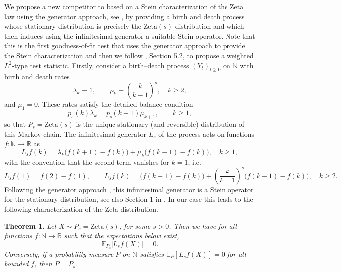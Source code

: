 \documentclass{article}
\theoremstyle{thm}
\newtheorem{theorem}{Theorem}[section]
\theoremstyle{def}
\begin{document}
We propose a new competitor to \cite{M:2009} based on a Stein characterization of the Zeta law using the generator approach, see \cite{B:1988,B:1990}, by providing a birth and death process whose stationary distribution is precisely the Zeta$(s)$ distribution and which then induces using the infinitesimal generator a suitable Stein operator. Note that this is the first goodness-of-fit test that uses the generator approach to provide the Stein characterization and then we follow \cite{Aetal:2023}, Section 5.2, to propose a weighted $L^2$-type test statistic. Firstly, consider a birth–death process \( (Y_t)_{t\ge0} \) on \( \mathbb{N} \) with birth and death rates
\[
\lambda_k = 1, \qquad
\mu_k = \left(\frac{k}{k-1}\right)^{s}, \quad k \ge 2,
\]
and \(\mu_1 = 0\). These rates satisfy the detailed balance condition
\[
p_s(k)\lambda_k = p_s(k+1)\mu_{k+1}, \qquad k\ge1,
\]
so that \(P_s= \mathrm{Zeta}(s)\) is the unique stationary (and reversible) distribution of this Markov chain. The infinitesimal generator $L_s$ of the process acts on functions \( f:\mathbb{N}\to\mathbb{R} \) as
\begin{equation}\label{eq:SOP}
L_s f(k)
= \lambda_k\big(f(k+1)-f(k)\big)
+ \mu_k\big(f(k-1)-f(k)\big), \quad k\ge1,
\end{equation}
with the convention that the second term vanishes for \(k=1\), i.e.
\[
L_s f(1) = f(2) - f(1),
\qquad
L_s f(k)
= \big(f(k+1) - f(k)\big)
+ \left(\frac{k}{k-1}\right)^{s}\big(f(k-1) - f(k)\big), \quad k \ge 2.
\]
Following the generator approach \citep{B:1988,B:1990}, this infinitesimal generator is a Stein operator for the stationary distribution, see also Section 1 in \cite{ER:2008}. In our case this leads to the following characterization of the Zeta distribution.
\begin{theorem}\label{thm:char1}
Let $X \sim P_s = \mathrm{Zeta}(s)$, for some $s>0$. Then we have for all functions \( f:\mathbb{N}\to\mathbb{R} \) such that the expectations below exist,
\[
\mathbb{E}_{P_s}\big[L_s f(X)\big] = 0.
\]
Conversely, if a probability measure \(P\) on \(\mathbb{N}\) satisfies
\(\mathbb{E}_P[L_s f(X)] = 0\) for all bounded \(f\),
then \(P = P_s\).
\end{theorem}
\end{document}

